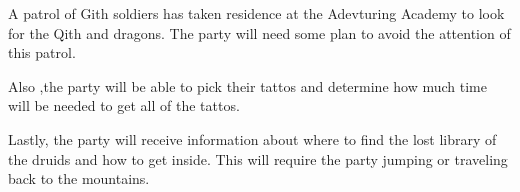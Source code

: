 A patrol of Gith soldiers has taken residence at the Adevturing Academy to look for the Qith and dragons.
The party will need some plan to avoid the attention of this patrol.

Also ,the party will be able to pick their tattos and determine how much time will be needed to get all of the tattos.

Lastly, the party will receive information about where to find the lost library of the druids and how to get inside.
This will require the party jumping or traveling back to the mountains.
